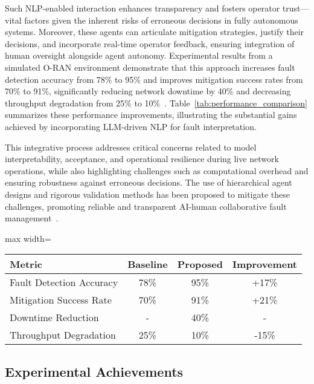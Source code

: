 \documentclass[sigconf]{acmart}
\begin{document}
Such NLP-enabled interaction enhances transparency and fosters operator trust—vital factors given the inherent risks of erroneous decisions in fully autonomous systems. Moreover, these agents can articulate mitigation strategies, justify their decisions, and incorporate real-time operator feedback, ensuring integration of human oversight alongside agent autonomy. Experimental results from a simulated O-RAN environment demonstrate that this approach increases fault detection accuracy from 78\% to 95\% and improves mitigation success rates from 70\% to 91\%, significantly reducing network downtime by 40\% and decreasing throughput degradation from 25\% to 10\%~\cite{ref55}. Table~\ref{tab:performance_comparison} summarizes these performance improvements, illustrating the substantial gains achieved by incorporating LLM-driven NLP for fault interpretation.

This integrative process addresses critical concerns related to model interpretability, acceptance, and operational resilience during live network operations, while also highlighting challenges such as computational overhead and ensuring robustness against erroneous decisions. The use of hierarchical agent designs and rigorous validation methods has been proposed to mitigate these challenges, promoting reliable and transparent AI-human collaborative fault management~\cite{ref55}.

\begin{table*}[htbp]
\centering
\caption{Performance Comparison of LLM-driven Agentic AI in O-RAN Fault Management~\cite{ref55}}
\label{tab:performance_comparison}
\begin{adjustbox}{max width=\textwidth}
\begin{tabular}{@{}lccc@{}}
\toprule
Metric & Baseline & Proposed & Improvement \\ \midrule
Fault Detection Accuracy & 78\% & 95\% & +17\% \\
Mitigation Success Rate & 70\% & 91\% & +21\% \\
Downtime Reduction & - & 40\% & - \\
Throughput Degradation & 25\% & 10\% & -15\% \\
\bottomrule
\end{tabular}
\end{adjustbox}
\end{table*}

\subsection{Experimental Achievements}
\end{document}

